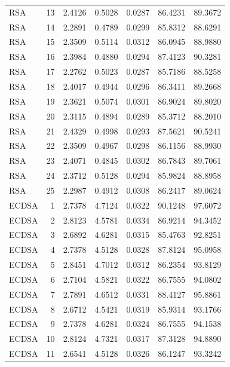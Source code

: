 \documentclass[11pt,a4paper]{article}
\begin{document}
{\begin{longtable}{l r r r r r r}
RSA       & 13 &    2.4126 & 0.5028 & 0.0287 & 86.4231 &    89.3672 \\
RSA       & 14 &    2.2891 & 0.4789 & 0.0299 & 85.8312 &    88.6291 \\
RSA       & 15 &    2.3509 & 0.5114 & 0.0312 & 86.0945 &    88.9880 \\
RSA       & 16 &    2.3984 & 0.4880 & 0.0294 & 87.4123 &    90.3281 \\
RSA       & 17 &    2.2762 & 0.5023 & 0.0287 & 85.7186 &    88.5258 \\
RSA       & 18 &    2.4017 & 0.4944 & 0.0296 & 86.3411 &    89.2668 \\
RSA       & 19 &    2.3621 & 0.5074 & 0.0301 & 86.9024 &    89.8020 \\
RSA       & 20 &    2.3115 & 0.4894 & 0.0289 & 85.3712 &    88.2010 \\
RSA       & 21 &    2.4329 & 0.4998 & 0.0293 & 87.5621 &    90.5241 \\
RSA       & 22 &    2.3509 & 0.4967 & 0.0298 & 86.1156 &    88.9930 \\
RSA       & 23 &    2.4071 & 0.4845 & 0.0302 & 86.7843 &    89.7061 \\
RSA       & 24 &    2.3712 & 0.5128 & 0.0294 & 85.9824 &    88.8958 \\
RSA       & 25 &    2.2987 & 0.4912 & 0.0308 & 86.2417 &    89.0624 \\
\midrule
ECDSA     &  1 &    2.7378 & 4.7124 & 0.0322 & 90.1248 &    97.6072 \\
ECDSA     &  2 &    2.8123 & 4.5781 & 0.0334 & 86.9214 &    94.3452 \\
ECDSA     &  3 &    2.6892 & 4.6281 & 0.0315 & 85.4763 &    92.8251 \\
ECDSA     &  4 &    2.7378 & 4.5128 & 0.0328 & 87.8124 &    95.0958 \\
ECDSA     &  5 &    2.8451 & 4.7012 & 0.0312 & 86.2354 &    93.8129 \\
ECDSA     &  6 &    2.7104 & 4.5821 & 0.0322 & 86.7555 &    94.0802 \\
ECDSA     &  7 &    2.7891 & 4.6512 & 0.0331 & 88.4127 &    95.8861 \\
ECDSA     &  8 &    2.6712 & 4.5421 & 0.0319 & 85.9314 &    93.1766 \\
ECDSA     &  9 &    2.7378 & 4.6281 & 0.0324 & 86.7555 &    94.1538 \\
ECDSA     & 10 &    2.8124 & 4.7321 & 0.0317 & 87.3128 &    94.8890 \\
ECDSA     & 11 &    2.6541 & 4.5128 & 0.0326 & 86.1247 &    93.3242 \\

\end{longtable}}
\end{document}

